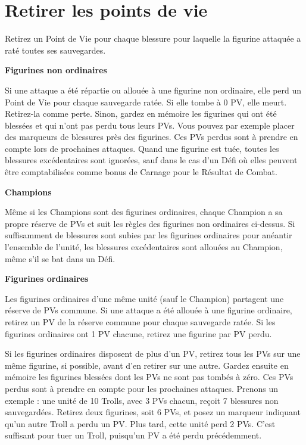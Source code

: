 \newpage
\section{Retirer les points de vie}

Retirez un Point de Vie pour chaque blessure pour laquelle la figurine attaquée a raté toutes ses sauvegardes.

\noindent\textbf{Figurines non ordinaires}

Si une attaque a été répartie ou allouée à une figurine non ordinaire, elle perd un Point de Vie pour chaque sauvegarde ratée. Si elle tombe à 0 PV, elle meurt. Retirez-la comme perte. Sinon, gardez en mémoire les figurines qui ont été blessées et qui n'ont pas perdu tous leurs PVs. Vous pouvez par exemple placer des marqueurs de blessures près des figurines. Ces PVs perdus sont à prendre en compte lors de prochaines attaques. Quand une figurine est tuée, toutes les blessures excédentaires sont ignorées, sauf dans le cas d'un Défi où elles peuvent être comptabilisées comme bonus de Carnage pour le Résultat de Combat. 

\noindent\textbf{Champions}

Même si les Champions sont des figurines ordinaires, chaque Champion a sa propre réserve de PVs et suit les règles des figurines non ordinaires ci-dessus. Si suffisamment de blessures sont subies par les figurines ordinaires pour anéantir l'ensemble de l'unité, les blessures excédentaires sont allouées au Champion, même s'il se bat dans un Défi.

\noindent\textbf{Figurines ordinaires}

Les figurines ordinaires d'une même unité (sauf le Champion) partagent une réserve de PVs commune. Si une attaque a été allouée à une figurine ordinaire, retirez un PV de la réserve commune pour chaque sauvegarde ratée. Si les figurines ordinaires ont 1 PV chacune, retirez une figurine par PV perdu.

Si les figurines ordinaires disposent de plus d'un PV, retirez tous les PVs sur une même figurine, si possible, avant d'en retirer sur une autre. Gardez ensuite en mémoire les figurines blessées dont les PVs ne sont pas tombés à zéro. Ces PVs perdus sont à prendre en compte pour les prochaines attaques. Prenons un exemple : une unité de 10 Trolls, avec 3 PVs chacun, reçoit 7 blessures non sauvegardées. Retirez deux figurines, soit 6 PVs, et posez un marqueur indiquant qu'un autre Troll a perdu un PV. Plus tard, cette unité perd 2 PVs. C'est suffisant pour tuer un Troll, puisqu'un PV a été perdu précédemment. 


